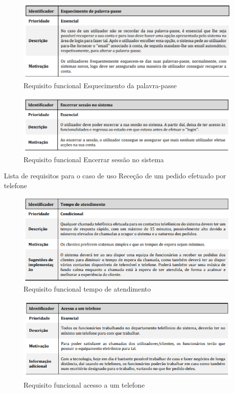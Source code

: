\begin{figure}[H]
	\centering
	\includegraphics[width=15cm]{requisito_funcional3}
	\caption{Requisito funcional Esquecimento da palavra-passe}
	\label{fig:requisitofuncional3}
\end{figure}

\begin{figure}[H]
	\centering
	\includegraphics[width=15cm]{requisito_funcional4}
	\caption{Requisito funcional Encerrar sessão no sistema}
	\label{fig:requisitofuncional4}
\end{figure}

Lista de requisitos para o caso de uso Receção de um pedido efetuado por telefone\\

\begin{figure}[H]
	\centering
	\includegraphics[width=15cm]{requisitofuncional5}
	\caption{Requisito funcional tempo de atendimento}
	\label{fig:requisitofuncional5}
\end{figure}

\begin{figure}[H]
	\centering
	\includegraphics[width=15cm]{requisitofuncional6}
	\caption{Requisito funcional acesso a um telefone}
	\label{fig:requisitofuncional6}
\end{figure}



